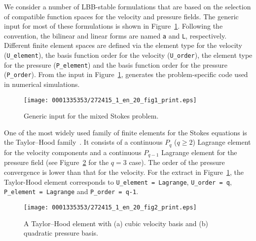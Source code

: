 We consider a number of LBB-stable formulations that are based on the
selection of compatible function spaces for the velocity and pressure
fields. The generic \ufl{} input for most of these formulations is shown
in Figure~\ref{code:terrel:var:mixed}.  Following the \ufl{} convention,
the bilinear and linear forms are named {\tt a} and {\tt L}, respectively.
Different finite element spaces are defined via the element type for the
velocity ({\tt U\_element}), the basis function order for the velocity
({\tt U\_order}), the element type for the pressure ({\tt P\_element})
and the basis function order for the pressure ({\tt P\_order}). From
the input in Figure~\ref{code:terrel:var:mixed}, \ffc{} generates the
problem-specific code used in numerical simulations.
%
\begin{figure}[!t]
\bwfig
\texttt{[image: 0001335353/272415\_1\_en\_20\_fig1\_print.eps]}
\caption{Generic \ufl{} input for the mixed Stokes problem.}
\label{code:terrel:var:mixed}\vspace*{4.5pt}
\end{figure}

One of the most widely used family of finite elements for the Stokes
equations is the Taylor--Hood family~\citep{TaylorHood1973,Boffi1997}.
It consists of a continuous $P_q$ ($q\geqslant 2$) Lagrange element for
the velocity components and a continuous $P_{q-1}$ Lagrange element for
the pressure field (see Figure~\ref{fig:terrel:THElements} for the $q=3$
case). The order of the pressure convergence is lower than that for the
velocity.  For the \ufl{} extract in Figure~\ref{code:terrel:var:mixed},
the Taylor-Hood element corresponds to {\tt U\_element = Lagrange},
{\tt U\_order = q}, {\tt P\_element = Lagrange} and {\tt P\_order = q-1}.

\makeatletter
\def\img@cmode{\hskip-5pt\begin{turn}{90}\rlap{\kern50\p@\@img@cmode{\@cmodetext}}\end{turn}}
\makeatother

\begin{figure}[!t]
\bwfig
\texttt{[image: 0001335353/272415\_1\_en\_20\_fig2\_print.eps]}
  \caption{A Taylor--Hood element with
(a)
  cubic velocity basis and
  (b) quadratic
  pressure basis.}\label{fig:terrel:THElements}\vspace*{4.5pt}
\end{figure}

